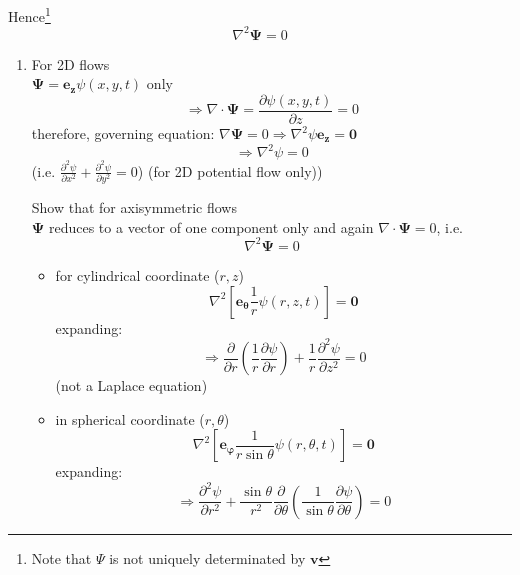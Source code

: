 Hence\footnote{Note that $\Psi$ is not uniquely determinated by $\mathbf{v}$}
\begin{equation}
\nabla^2\boldsymbol{\Psi} = 0
\label{eq: 4-1-3}
\end{equation}
\begin{enumerate}[label = (\alph*)]
\item For 2D flows\\
$\boldsymbol{\Psi} = \mathbf{e_z}\psi(x,y,t)$ only
\[
\Longrightarrow\nabla\cdot\boldsymbol{\Psi} = \frac{\partial\psi(x,y,t)}{\partial z} = 0
\]
therefore, governing equation: $\nabla\boldsymbol{\Psi} = 0\Longrightarrow\nabla^2\psi\mathbf{e_z} = \mathbf{0}$
\begin{equation}
\Longrightarrow\boxed{\nabla^2\psi = 0}
\end{equation}
(i.e. $\displaystyle\frac{\partial^2\psi}{\partial x^2} + \frac{\partial^2\psi}{\partial y^2} = 0$) (for 2D potential flow only))
\begin{exercise}{Show that for axisymmetric flows}\\
$\boldsymbol{\Psi}$ reduces to a vector of one component only and again $\nabla\cdot\boldsymbol{\Psi} = 0$, i.e.
\[
\boxed{\nabla^2\boldsymbol{\Psi} = 0}
\]
\begin{itemize}
\item for cylindrical coordinate ($r,z$)
\[
\nabla^2\left[\mathbf{e_\theta}\frac{1}{r}\psi(r,z,t)\right] = \mathbf{0}
\]
expanding:
\begin{equation}
\Longrightarrow\frac{\partial}{\partial r}\left(\frac{1}{r}\frac{\partial\psi}{\partial r}\right) + \frac{1}{r}\frac{\partial^2\psi}{\partial z^2} = 0
\label{eq: 4-1-4}
\end{equation}
(not a Laplace equation)
\item in spherical coordinate ($r,\theta$)
\[
\nabla^2\left[\mathbf{e_\varphi}\frac{1}{r\sin\theta}\psi(r,\theta,t)\right] = \mathbf{0}
\]
expanding:
\begin{equation}
\Longrightarrow\frac{\partial^2\psi}{\partial r^2} + \frac{\sin\theta}{r^2}\frac{\partial}{\partial\theta}\left(\frac{1}{\sin\theta}\frac{\partial\psi}{\partial\theta}\right) = 0
\label{eq: 4-1-4}
\end{equation}
\end{itemize}
\end{exercise}
\end{enumerate}
